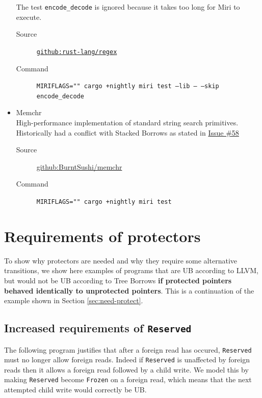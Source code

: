 \documentclass[a4paper,11pt]{article}
\theoremstyle{plain}
\theoremstyle{definition}
\theoremstyle{remark}
\newcommand{\tperm}[1]{\texttt{#1}}
\begin{document}
\begin{itemize}
        The test \texttt{encode\_decode} is ignored because it takes too long for Miri to execute.
        \begin{description}
            \item[Source] \href{https://github.com/rust-lang/regex}{\texttt{github:rust-lang/regex}}
            \item[Command] \texttt{MIRIFLAGS="" cargo +nightly miri test --lib -- --skip encode\_decode}
        \end{description}
    \item Memchr\\
        High-performance implementation of standard string search primitives.
        Historically had a conflict with Stacked Borrows as stated in
        \href{https://github.com/BurntSushi/memchr/issues/58}{Issue \#58}
        \begin{description}
            \item[Source] \href{https://github.com/BurntSushi/memchr}{github:BurntSushi/memchr}
            \item[Command] \texttt{MIRIFLAGS="" cargo +nightly miri test}
        \end{description}
\end{itemize}

\newpage
\section{Requirements of protectors}
\label{app:need-protect}

To show why protectors are needed and why they require some alternative
transitions, we show here examples of programs that are UB according to LLVM,
but would not be UB according to Tree Borrows \textbf{if protected pointers behaved identically to unprotected pointers}.
This is a continuation of the example shown in Section \ref{sec:need-protect}.

\subsection{Increased requirements of \tperm{Reserved}}

The following program justifies that after a foreign read has occured, \tperm{Reserved} must no longer allow
foreign reads. Indeed if \tperm{Reserved} is unaffected by foreign reads then it allows a foreign read
followed by a child write. We model this by making \tperm{Reserved} become \tperm{Frozen} on a foreign read,
which means that the next attempted child write would correctly be UB.
\end{document}
